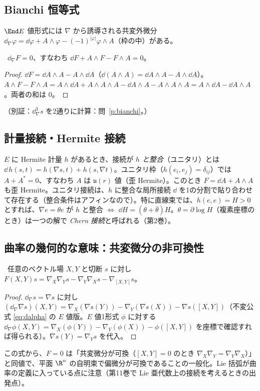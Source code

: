\subsection{Bianchi 恒等式}
$\End E$ 値形式には $\nabla$ から誘導される共変外微分 $\dd_\nabla\varphi=\dd\varphi+A\wedge\varphi-(-1)^{|\varphi|}\varphi\wedge A$（枠の中）がある。
\begin{thm}[Bianchi]\label{thm:bianchi}\tP\
$\dd_\nabla F=0$、すなわち $\dd F+A\wedge F-F\wedge A=0$。
\end{thm}
\begin{proof}
$\dd F=\dd A\wedge A-A\wedge\dd A$（$\dd(A\wedge A)=\dd A\wedge A-A\wedge\dd A$）。$A\wedge F-F\wedge A=A\wedge\dd A+A\wedge A\wedge A-\dd A\wedge A-A\wedge A\wedge A=A\wedge\dd A-\dd A\wedge A$。両者の和は $0$。
\end{proof}
（別証：$\dd_\nabla^3 s$ を2通りに計算：問~\ref{p:bianchi}。）

\subsection{計量接続・Hermite 接続}
$E$ に Hermite 計量 $h$ があるとき、接続が \emph{$h$ と整合}（ユニタリ）とは $\dd\,h(s,t)=h(\nabla s,t)+h(s,\nabla t)$。ユニタリ枠（$h(e_i,e_j)=\delta_{ij}$）では $A+A^*=0$、すなわち $A$ は $\mathfrak u(r)$ 値（歪 Hermite）。このとき $F=\dd A+A\wedge A$ も歪 Hermite。ユニタリ接続は、$h$ に整合な局所接続 $\dd$ を1の分割で貼り合わせて存在する（整合条件はアフィンなので）。特に直線束では、$h(e,e)=H>0$ とすれば、$\nabla e=\theta e$ が $h$ と整合 $\Leftrightarrow$ $\dd H=(\theta+\bar\theta)H$。$\theta=\partial\log H$（複素座標のとき）は一つの解で \emph{Chern 接続}と呼ばれる（第2巻）。



\subsection{曲率の幾何的な意味：共変微分の非可換性}
\begin{prop}\label{prop:FXY}\tP\
任意のベクトル場 $X,Y$ と切断 $s$ に対し $F(X,Y)s=\nabla_X\nabla_Ys-\nabla_Y\nabla_Xs-\nabla_{[X,Y]}s$。
\end{prop}
\begin{proof}
$\dd_\nabla s=\nabla s$ に対し $(\dd_\nabla\nabla s)(X,Y)=\nabla_X(\nabla s(Y))-\nabla_Y(\nabla s(X))-\nabla s([X,Y])$（不変公式 \eqref{eq:dalpha} の $E$ 値版。$E$ 値1形式 $\phi$ に対する $\dd_\nabla\phi(X,Y)=\nabla_X(\phi(Y))-\nabla_Y(\phi(X))-\phi([X,Y])$ を座標で確認すれば得られる）。$\nabla s(Y)=\nabla_Ys$ を代入。
\end{proof}
この式から、$F=0$ は「共変微分が可換（$[X,Y]=0$ のとき $\nabla_X\nabla_Y=\nabla_Y\nabla_X$）」と同値で、平面 $\R^n$ の自明束で偏微分が可換であることの一般化。Lie 括弧が曲率の定義に入っている点に注意（第11巻で Lie 亜代数上の接続を考えるときの出発点）。

